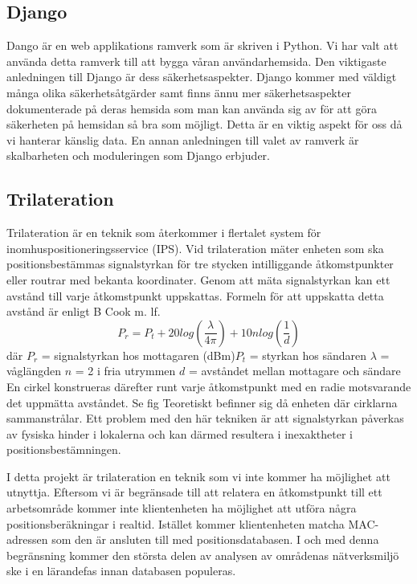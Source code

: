 \documentclass[swedish, a4paper,12pt]{article}
\begin{document}
\subsection{Django}
Dango är en web applikations ramverk som är skriven i Python. Vi har valt att använda detta ramverk till att bygga våran användarhemsida. Den viktigaste anledningen till Django är dess säkerhetsaspekter. Django kommer med väldigt många olika säkerhetsåtgärder samt finns ännu mer säkerhetsaspekter dokumenterade på deras hemsida som man kan använda sig av för att göra säkerheten på hemsidan så bra som möjligt.\cite{securityInDjango} Detta är en viktig aspekt för oss då vi hanterar känslig data. En annan anledningen till valet av ramverk är skalbarheten och moduleringen som Django erbjuder. %

\iffalse
\subsection{Trilateration}
Trilateration är en teknik som återkommer i flertalet system för inomhuspositioneringsservice (IPS). Vid trilateration mäter enheten som ska positionsbestämmas signalstyrkan för tre stycken intilliggande åtkomstpunkter eller routrar med bekanta koordinater. Genom att mäta signalstyrkan kan ett avstånd till varje åtkomstpunkt uppskattas. Formeln för att uppskatta detta avstånd är enligt B Cook m. lf.\cite{cook2005indoor}
\newline
$$ P_r = P_t + 20log(\frac{\lambda}{4\pi}) + 10nlog(\frac{1}{d})$$
där
$  P_r $ = signalstyrkan hos mottagaren (dBm)\newline $P_t$ = styrkan hos sändaren\newline
$\lambda$ = våglängden\newline
$ n $ = 2 i fria utrymmen\newline
$ d $ = avståndet mellan mottagare och sändare
\bigskip
\newline
En cirkel konstrueras därefter runt varje åtkomstpunkt med en radie motsvarande det uppmätta avståndet. Se fig %
Teoretiskt befinner sig då enheten där cirklarna sammanstrålar. Ett problem med den här tekniken är att signalstyrkan påverkas av fysiska hinder i lokalerna och kan därmed resultera i inexaktheter i positionsbestämningen.

I detta projekt är trilateration en teknik som vi inte kommer ha möjlighet att utnyttja. Eftersom vi är begränsade till att relatera en åtkomstpunkt till ett arbetsområde kommer inte klientenheten ha möjlighet att utföra några positionsberäkningar i realtid. Istället kommer klientenheten matcha MAC-adressen som den är ansluten till med positionsdatabasen. I och med denna begränsning kommer den största delen av analysen av områdenas nätverksmiljö ske i en lärandefas innan databasen populeras.
\end{document}

